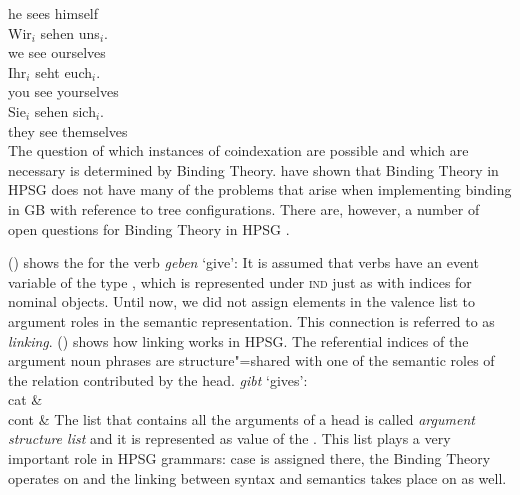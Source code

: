      he sees himself\\
\ex 
\gll Wir$_i$ sehen uns$_i$.\\
     we      see   ourselves\\
\ex 
\gll Ihr$_i$ seht euch$_i$.\\
     you see yourselves\\
\ex 
\gll Sie$_i$ sehen sich$_i$.\\
     they see themselves\\
\zl
The question of which instances of coindexation are possible and which are necessary is determined by Binding Theory.
\citet{PS92,ps2} have shown that Binding Theory in HPSG does not have many of the problems that arise when implementing binding in GB
with reference to tree configurations. There are, however, a number of open questions for Binding Theory in HPSG \citep[Section~20.4]{Mueller99a}.

() shows the \contv for the verb \emph{geben} `give':
\ea
\label{mrs-geben}
\z
It is assumed that verbs have an event variable of the type , which is represented under \textsc{ind} just as with indices for nominal objects.
Until now, we did not assign elements in the valence list to argument roles in the semantic representation. This connection is referred to
as \emph{linking}. () shows how linking works in HPSG. The referential indices of the argument
noun phrases are structure"=shared with one of the semantic roles of the relation contributed by the
head.
\eas
\label{le-geben}
\emph{gibt} `gives':\\
\ms
{ cat &  \\
  cont &  
}
\zs
The list that contains all the arguments of a head is called \emph{argument structure list} and it
is represented as value of the \argstf. This list plays a very important role in HPSG grammars: case
is assigned there, the Binding Theory operates on \argst and the linking between syntax and
semantics takes place on \argst as well. 

